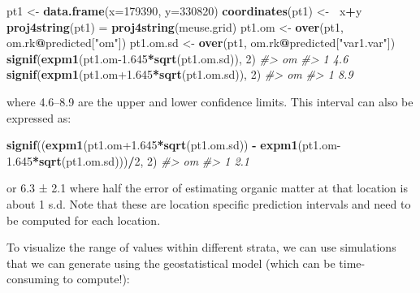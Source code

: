 \documentclass[graybox,natbib,nospthms,UStrade]{svmono}
\newenvironment{Shaded}{\begin{snugshade}}{\end{snugshade}}
\newcommand{\CommentTok}[1]{\textcolor[rgb]{0.37,0.37,0.37}{\textit{#1}}}
\newcommand{\DataTypeTok}[1]{\textcolor[rgb]{0.27,0.27,0.27}{#1}}
\newcommand{\DecValTok}[1]{\textcolor[rgb]{0.06,0.06,0.06}{#1}}
\newcommand{\ErrorTok}[1]{\textcolor[rgb]{0.14,0.14,0.14}{\textbf{#1}}}
\newcommand{\FloatTok}[1]{\textcolor[rgb]{0.06,0.06,0.06}{#1}}
\newcommand{\KeywordTok}[1]{\textcolor[rgb]{0.27,0.27,0.27}{\textbf{#1}}}
\newcommand{\NormalTok}[1]{#1}
\newcommand{\OperatorTok}[1]{\textcolor[rgb]{0.43,0.43,0.43}{\textbf{#1}}}
\newcommand{\StringTok}[1]{\textcolor[rgb]{0.5,0.5,0.5}{#1}}
\begin{document}
\begin{Shaded}
\begin{Highlighting}[]
\NormalTok{pt1 <-}\StringTok{ }\KeywordTok{data.frame}\NormalTok{(}\DataTypeTok{x=}\DecValTok{179390}\NormalTok{, }\DataTypeTok{y=}\DecValTok{330820}\NormalTok{)}
\KeywordTok{coordinates}\NormalTok{(pt1) <-}\StringTok{ }\ErrorTok{~}\NormalTok{x}\OperatorTok{+}\NormalTok{y}
\KeywordTok{proj4string}\NormalTok{(pt1) =}\StringTok{ }\KeywordTok{proj4string}\NormalTok{(meuse.grid)}
\NormalTok{pt1.om <-}\StringTok{ }\KeywordTok{over}\NormalTok{(pt1, om.rk}\OperatorTok{@}\NormalTok{predicted[}\StringTok{"om"}\NormalTok{])}
\NormalTok{pt1.om.sd <-}\StringTok{ }\KeywordTok{over}\NormalTok{(pt1, om.rk}\OperatorTok{@}\NormalTok{predicted[}\StringTok{"var1.var"}\NormalTok{])}
\KeywordTok{signif}\NormalTok{(}\KeywordTok{expm1}\NormalTok{(pt1.om}\FloatTok{-1.645}\OperatorTok{*}\KeywordTok{sqrt}\NormalTok{(pt1.om.sd)), }\DecValTok{2}\NormalTok{)}
\CommentTok{#>    om}
\CommentTok{#> 1 4.6}
\KeywordTok{signif}\NormalTok{(}\KeywordTok{expm1}\NormalTok{(pt1.om}\FloatTok{+1.645}\OperatorTok{*}\KeywordTok{sqrt}\NormalTok{(pt1.om.sd)), }\DecValTok{2}\NormalTok{)}
\CommentTok{#>    om}
\CommentTok{#> 1 8.9}
\end{Highlighting}
\end{Shaded}

where 4.6--8.9 are the upper and lower confidence limits. This interval can
also be expressed as:

\begin{Shaded}
\begin{Highlighting}[]
\KeywordTok{signif}\NormalTok{((}\KeywordTok{expm1}\NormalTok{(pt1.om}\FloatTok{+1.645}\OperatorTok{*}\KeywordTok{sqrt}\NormalTok{(pt1.om.sd)) }\OperatorTok{-}
\StringTok{       }\KeywordTok{expm1}\NormalTok{(pt1.om}\FloatTok{-1.645}\OperatorTok{*}\KeywordTok{sqrt}\NormalTok{(pt1.om.sd)))}\OperatorTok{/}\DecValTok{2}\NormalTok{, }\DecValTok{2}\NormalTok{)}
\CommentTok{#>    om}
\CommentTok{#> 1 2.1}
\end{Highlighting}
\end{Shaded}

or 6.3 ± 2.1 where half the error of estimating organic matter
at that location is about 1 s.d. Note that these are location
specific prediction intervals and need to be computed for each location.

To visualize the range of values within different strata, we can use
simulations that we can generate using the geostatistical model (which
can be time-consuming to compute!):
\end{document}
